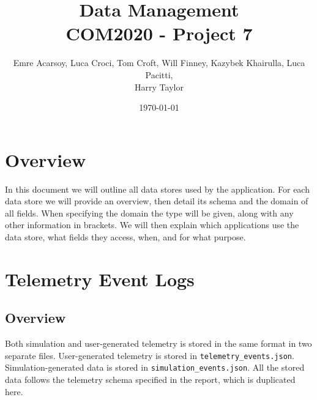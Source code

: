 \documentclass[11pt]{article}
\title{Data Management\\[0.3em]
\large COM2020 - Project 7}
\author{Emre Acarsoy, Luca Croci, Tom Croft, Will Finney, Kazybek Khairulla, Luca Pacitti, \\ Harry Taylor}
\date{\today}
\begin{document}
\maketitle
\tableofcontents
\newpage
\section{Overview}
In this document we will outline all data stores used by the application. For each data store we will provide an overview, then detail its schema and the domain of all fields. When specifying the domain the type will be given, along with any other information in brackets.  We will then explain which applications use the data store, what fields they access, when, and for what purpose.

\section{Telemetry Event Logs}
\subsection{Overview}
Both simulation and user-generated telemetry is stored in the same format in two separate files. User-generated telemetry is stored in \verb|telemetry_events.json|. Simulation-generated data is stored in \verb|simulation_events.json|. All the stored data follows the telemetry schema specified in the report, which is duplicated here.
\end{document}
